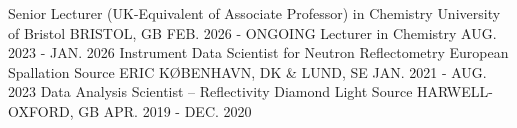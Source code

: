 \begin{cventries}
  \cventryn
    {Senior Lecturer (UK-Equivalent of Associate Professor) in Chemistry}
    {University of Bristol}
    {BRISTOL, GB}
    {FEB. 2026 - ONGOING}
  \cventryn
    {Lecturer in Chemistry}
    {}
    {}
    {AUG. 2023 - JAN. 2026}
  \cventryn
    {Instrument Data Scientist for Neutron Reflectometry}
    {European Spallation Source ERIC}
    {K\O BENHAVN, DK \& LUND, SE}
    {JAN. 2021 - AUG. 2023}
  \cventryn
    {Data Analysis Scientist -- Reflectivity}
    {Diamond Light Source}
    {HARWELL-OXFORD, GB}
    {APR. 2019 - DEC. 2020}
\end{cventries}
